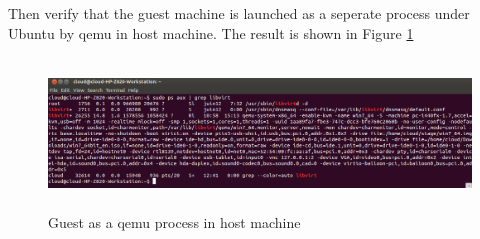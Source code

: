 Then verify that the guest machine is launched as a seperate process under Ubuntu by qemu in host machine. The result is shown in Figure \ref{fig:Guest as a qemu process in host machine}
\begin{figure}[htbp]
	\centering
		\includegraphics[width=14cm, height= 4cm ]{Figures/Figure18.png}
	\caption[Guest as a qemu process in host machine]{Guest as a qemu process in host machine}
	\label{fig:Guest as a qemu process in host machine}
\end{figure}


